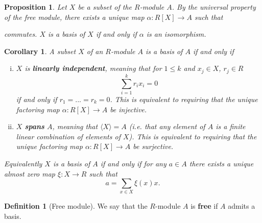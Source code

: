 \documentclass[a4paper,12pt,parskip=half*,chapterprefix=true,numbers=noendperiod]{scrreprt}
\newtheorem{proposition}{Proposition}[section]
\newtheorem{corollary}{Corollary}[section]
\theoremstyle{definition}
\newtheorem{definition}{Definition}[section]
\theoremstyle{remark}
\begin{document}
\begin{proposition}
	Let $X$ be a subset of the $R$-module $A$. By the universal property of the free module, there exists a unique map $\alpha:R[X]\to A$ such that
	\begin{figure}[H]
	\centering
	\end{figure}
	commutes. $X$ is a basis of $X$ if and only if $\alpha$ is an isomorphism.
\end{proposition}

\begin{corollary}
	A subset $X$ of an $R$-module $A$ is a basis of $A$ if and only if
	\begin{enumerate}[(i)]
		\item $X$ is \textbf{linearly independent}, meaning that for $1\leq k$ and $x_j\in X$, $r_j\in R$
		\begin{equation*}
			\sum_{i=1}^kr_ix_i=0
		\end{equation*}
		if and only if $r_1=...=r_k=0$. This is equivalent to requiring that the unique factoring map $\alpha:R[X]\to A$ be injective.
		\item $X$ \textbf{spans} $A$, meaning that $\langle X\rangle=A$ (i.e. that any element of $A$ is a finite linear combination of elements of $X$). This is equivalent to requiring that the unique factoring map $\alpha:R[X]\to A$ be surjective. 
	\end{enumerate}
	Equivalently $X$ is a basis of $A$ if and only if for any $a\in A$ there exists a unique almost zero map $\xi:X\to R$ such that
	\begin{equation*}
		a=\sum_{x\in X}\xi(x)x.
	\end{equation*}
\end{corollary}

\begin{definition}[Free module]
	We say that the $R$-module $A$ is \textbf{free} if $A$ admits a basis.
\end{definition}
\end{document}
